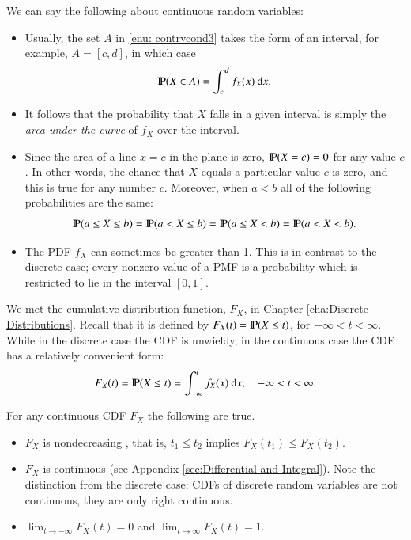 \documentclass[captions=tableheading]{scrbook}
\begin{document}
\begin{rem}
We can say the following about continuous random variables:
\begin{itemize}
\item Usually, the set \(A\) in \ref{enu: contrvcond3} takes the form of an interval, for example, \(A=[c,d]\), in which case
  \begin{equation}
  \P(X\in A)=\int_{c}^{d}f_{X}(x)\:\mathrm{d} x.
  \end{equation}
\item It follows that the probability that \(X\) falls in a given interval is simply the \emph{area under the curve} of \(f_{X}\) over the interval.
\item Since the area of a line \(x=c\) in the plane is zero, \(\P(X=c)=0\)  for any value \(c\). In other words, the chance that \(X\) equals a particular value \(c\) is zero, and this is true for any number \(c\). Moreover, when \(a<b\) all of the following probabilities are the same:
  \begin{equation}
  \P(a\leq X\leq b)=\P(a<X\leq b)=\P(a\leq X<b)=\P(a<X<b).
  \end{equation}
\item The PDF \(f_{X}\) can sometimes be greater than 1. This is in contrast to the discrete case; every nonzero value of a PMF is a probability which is restricted to lie in the interval \([0,1]\).
\end{itemize}

\end{rem}

We met the cumulative distribution function, \(F_{X}\), in Chapter \ref{cha:Discrete-Distributions}. Recall that it is defined by \(F_{X}(t)=\P(X\leq t)\), for \(-\infty<t<\infty\). While in the discrete case the CDF is unwieldy, in the continuous case the CDF has a relatively convenient form:
\begin{equation}
F_{X}(t)=\P(X\leq t)=\int_{-\infty}^{t}f_{X}(x)\:\mathrm{d} x,\quad-\infty<t<\infty.
\end{equation}

\begin{rem}
For any continuous CDF \(F_{X}\) the following are true.
\begin{itemize}
\item \(F_{X}\) is nondecreasing , that is, \(t_{1}\leq t_{2}\) implies \(F_{X}(t_{1})\leq F_{X}(t_{2})\).
\item \(F_{X}\) is continuous (see Appendix \ref{sec:Differential-and-Integral}). Note the distinction from the discrete case: CDFs of discrete random variables are not continuous, they are only right continuous.
\item \(\lim_{t\to-\infty}F_{X}(t)=0\) and \(\lim_{t\to\infty}F_{X}(t)=1\).
\end{itemize}

\end{rem}
\end{document}
